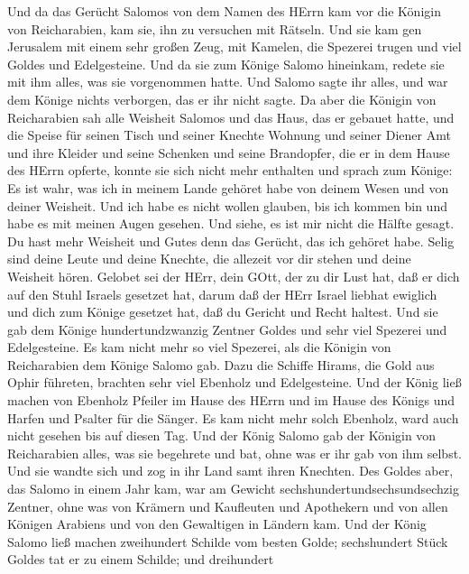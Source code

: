  Und da das Gerücht Salomos von dem Namen des HErrn kam vor
die Königin von Reicharabien, kam sie, ihn zu versuchen mit Rätseln.
 Und sie kam gen Jerusalem mit einem sehr großen Zeug, mit
Kamelen, die Spezerei trugen und viel Goldes und Edelgesteine. Und da
sie zum Könige Salomo hineinkam, redete sie mit ihm alles, was sie
vorgenommen hatte.  Und Salomo sagte ihr alles, und war dem
Könige nichts verborgen, das er ihr nicht sagte.  Da aber
die Königin von Reicharabien sah alle Weisheit Salomos und das Haus, das
er gebauet hatte,  und die Speise für seinen Tisch und
seiner Knechte Wohnung und seiner Diener Amt und ihre Kleider und seine
Schenken und seine Brandopfer, die er in dem Hause des HErrn opferte,
konnte sie sich nicht mehr enthalten  und sprach zum Könige:
Es ist wahr, was ich in meinem Lande gehöret habe von deinem Wesen und
von deiner Weisheit.  Und ich habe es nicht wollen glauben,
bis ich kommen bin und habe es mit meinen Augen gesehen. Und siehe, es
ist mir nicht die Hälfte gesagt. Du hast mehr Weisheit und Gutes denn
das Gerücht, das ich gehöret habe.  Selig sind deine Leute
und deine Knechte, die allezeit vor dir stehen und deine Weisheit hören.
 Gelobet sei der HErr, dein GOtt, der zu dir Lust hat, daß
er dich auf den Stuhl Israels gesetzet hat, darum daß der HErr Israel
liebhat ewiglich und dich zum Könige gesetzet hat, daß du Gericht und
Recht haltest.  Und sie gab dem Könige hundertundzwanzig
Zentner Goldes und sehr viel Spezerei und Edelgesteine. Es kam nicht
mehr so viel Spezerei, als die Königin von Reicharabien dem Könige
Salomo gab.  Dazu die Schiffe Hirams, die Gold aus Ophir
führeten, brachten sehr viel Ebenholz und Edelgesteine. 
Und der König ließ machen von Ebenholz Pfeiler im Hause des HErrn und im
Hause des Königs und Harfen und Psalter für die Sänger. Es kam nicht
mehr solch Ebenholz, ward auch nicht gesehen bis auf diesen Tag.
 Und der König Salomo gab der Königin von Reicharabien
alles, was sie begehrete und bat, ohne was er ihr gab von ihm selbst.
Und sie wandte sich und zog in ihr Land samt ihren Knechten.
 Des Goldes aber, das Salomo in einem Jahr kam, war am
Gewicht sechshundertundsechsundsechzig Zentner,  ohne was
von Krämern und Kaufleuten und Apothekern und von allen Königen Arabiens
und von den Gewaltigen in Ländern kam.  Und der König
Salomo ließ machen zweihundert Schilde vom besten Golde; sechshundert
Stück Goldes tat er zu einem Schilde;  und dreihundert
